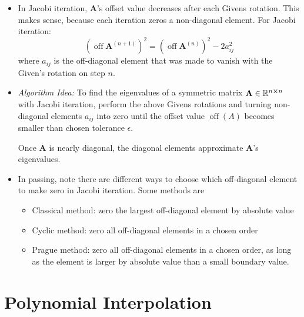 \documentclass[11pt, a4paper]{article}
\newcommand{\R}{\mathbb{R}} %
\newcommand{\mat}[1]{\mathbf{#1}} %
\begin{document}
\begin{itemize}
	
	\item In Jacobi iteration, $ \mat{A} $'s offset value decreases after each Givens rotation. This makes sense, because each iteration zeros a non-diagonal element. For Jacobi iteration:
	\begin{equation*}
		\left(\operatorname{off}\mat{A}^{(n+1)}\right)^2 = \left(\operatorname{off}\mat{A}^{(n)}\right)^2 - 2a^2_{ij}
	\end{equation*}
	where $ a_{ij} $ is the off-diagonal element that was made to vanish with the Given's rotation on step $ n $.
	
	
	\item \textit{Algorithm Idea:} To find the eigenvalues of a symmetric matrix $ \mat{A} \in \R^{n \cross n} $ with Jacobi iteration, perform the above Givens rotations and turning non-diagonal elements $ a_{ij} $ into zero until the offset value $ \operatorname{off}(A) $ becomes smaller than chosen tolerance $ \epsilon $.
	
	Once $ \mat{A} $ is nearly diagonal, the diagonal elements approximate $ \mat{A} $'s eigenvalues. 
	
	
	\item In passing, note there are different ways to choose which off-diagonal element to make zero in Jacobi iteration. Some methods are
	\begin{itemize}
		\item Classical method: zero the largest off-diagonal element by absolute value
		\item Cyclic method: zero all off-diagonal elements in a chosen order
		\item Prague method: zero all off-diagonal elements in a chosen order, as long as the element is larger by absolute value than a small boundary value.
	\end{itemize}
	
\end{itemize}




\section{Polynomial Interpolation}
\end{document}
